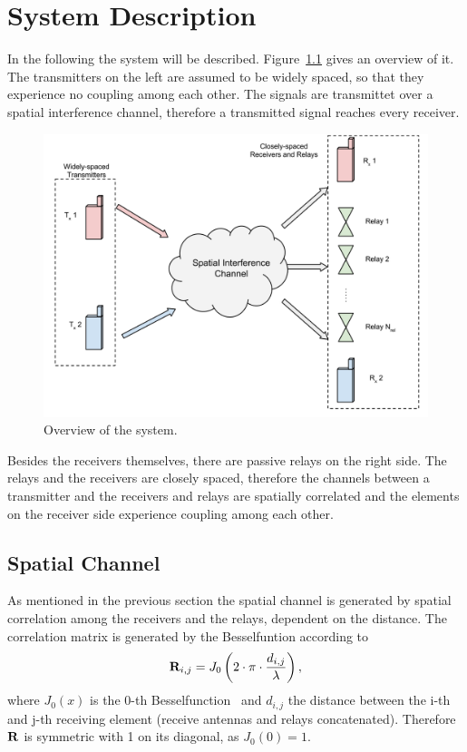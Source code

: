 \chapter{System Description}
\label{sec:system}

In the following the system will be described.
Figure~\ref{fig:system} gives an overview of it.
The transmitters on the left are assumed to be widely spaced, so that they experience no coupling among each other.
The signals are transmittet over a spatial interference channel, therefore a transmitted signal reaches every receiver.
\begin{figure}[h]
\begin{center}
\includegraphics[width=\textwidth]{images/System.png}
\caption{Overview of the system.}
\label{fig:system}
\end{center}
\end{figure}

Besides the receivers themselves, there are passive relays on the right side.
The relays and the receivers are closely spaced, therefore the channels between a transmitter and the receivers and relays are spatially correlated and the elements on the receiver side experience coupling among each other.

\section{Spatial Channel}
\label{sec:spatial}

As mentioned in the previous section the spatial channel is generated by spatial correlation among the receivers and the relays, dependent on the distance.
The correlation matrix is generated by the Besselfuntion according to
\begin{equation}
\label{eq:spatial_corr}
\mathbf{R}_{i,j} = J_0\left(2\cdot \pi\cdot \frac{d_{i,j}}{\lambda}\right),
\end{equation}
where $J_0(x)$ is the 0-th Besselfunction~\cite[p.191]{Kreyszig} and $d_{i,j}$ the distance between the i-th and j-th receiving element (receive antennas and relays concatenated).
Therefore $\mathbf{R}$ is symmetric with 1 on its diagonal, as $J_0(0)=1$.

